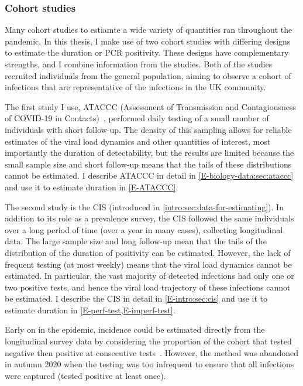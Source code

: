 \documentclass[thesis.tex]{subfiles}
\begin{document}
\subsubsection{Cohort studies}

Many cohort studies to estiamte a wide variety of quantities ran throughout the pandemic.
In this thesis, I make use of two cohort studies with differing designs to estimate the duration or PCR positivity.
These designs have complementary strengths, and I combine information from the studies.
Both of the studies recruited individuals from the general population, aiming to observe a cohort of infections that are representative of the infections in the UK community.

The first study I use, ATACCC (Assessment of Transmission and Contagiousness of COVID-19 in Contacts)~\autocite{singanayagamCommunity,hakkiOnset}, performed daily testing of a small number of individuals with short follow-up.
The density of this sampling allows for reliable estimates of the viral load dynamics and other quantities of interest, most importantly the duration of detectability, but the results are limited because the small sample size and short follow-up means that the tails of these distributions cannot be estimated.
I describe ATACCC in detail in \cref{E-biology-data:sec:ataccc} and use it to estimate duration in \cref{E-ATACCC}.

The second study is the CIS (introduced in \cref{intro:sec:data-for-estimating}).
In addition to its role as a prevalence survey, the CIS followed the same individuals over a long period of time (over a year in many cases), collecting longitudinal data.
The large sample size and long follow-up mean that the tails of the distribution of the duration of positivity can be estimated.
However, the lack of frequent testing (at most weekly) means that the viral load dynamics cannot be estimated.
In particular, the vast majority of detected infections had only one or two positive tests, and hence the viral load trajectory of these infections cannot be estimated.
I describe the CIS in detail in \cref{E-intro:sec:cis} and use it to estimate duration in \cref{E-perf-test,E-imperf-test}.

Early on in the epidemic, incidence could be estimated directly from the longitudinal survey data by considering the proportion of the cohort that tested negative then positive at consecutive tests~\autocite{onsIncidenceOld}.
However, the method was abandoned in autumn 2020 when the testing was too infrequent to ensure that all infections were captured (\ie tested positive at least once).
\end{document}
